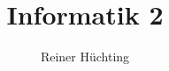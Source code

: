 \usepackage[utf8]{inputenc}
\usepackage[german]{babel}
\usepackage{hyperref}
\usepackage{color, colortbl}
\usepackage[noend]{algpseudocode}

\usepackage{beamercmds}
\usepackage{listingcmds}

\AtBeginLecture{}

\AtBeginPart{
  \partcontentframe
}

\AtBeginSection{
  \sectioncontentframe
}


\newcommand{\positive}{\color{ForestGreen}\textbf{+}}
\newcommand{\negative}{\color{Red}\textbf{--\,}}
\renewcommand{\gets}{:=}

\usepackage{tikz}
\usepackage{tikz-uml}
\usetikzlibrary{positioning}

\author{Reiner Hüchting}
\title{Informatik 2}